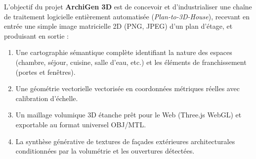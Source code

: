\documentclass[11pt,a4paper]{report}
\begin{document}
L'objectif du projet \textbf{ArchiGen 3D} est de concevoir et d'industrialiser une chaîne de traitement logicielle entièrement automatisée (\emph{Plan-to-3D-House}), recevant en entrée une simple image matricielle 2D (PNG, JPEG) d'un plan d'étage, et produisant en sortie :
\begin{enumerate}
    \item Une cartographie sémantique complète identifiant la nature des espaces (chambre, séjour, cuisine, salle d'eau, etc.) et les éléments de franchissement (portes et fenêtres).
    \item Une géométrie vectorielle vectorisée en coordonnées métriques réelles avec calibration d'échelle.
    \item Un maillage volumique 3D étanche prêt pour le Web (Three.js WebGL) et exportable au format universel OBJ/MTL.
    \item La synthèse générative de textures de façades extérieures architecturales conditionnées par la volumétrie et les ouvertures détectées.
\end{enumerate}
\end{document}
